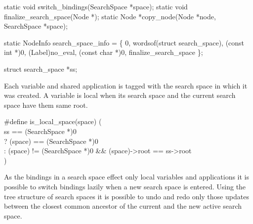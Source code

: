 static void switch_bindings(SearchSpace *space);
static void finalize_search_space(Node *);
static Node *copy_node(Node *node, SearchSpace *space);

static NodeInfo search_space_info = \{
    0, wordsof(struct search_space), (const int *)0, (Label)no_eval, (const char *)0,
    finalize_search_space
\};

struct search_space *ss;

\nwendcode{}\nwdocspar
Each variable and shared application is tagged with the search space
in which it was created. A variable is local when its search space and
the current search space have them same root.

\nwenddocs{}\plusendmoddef\nwstartdeflinemarkup{}\nwenddeflinemarkup
#define is_local_space(space) ( \\
    ss == (SearchSpace *)0 \\
    ? (space) == (SearchSpace *)0 \\
    : (space) != (SearchSpace *)0 && (space)->root == ss->root \\
)

\nwendcode{}\nwdocspar
As the bindings in a search space effect only local variables and
applications it is possible to switch bindings lazily when a new
search space is entered. Using the tree structure of search spaces it
is possible to undo and redo only those updates between the closest
common ancestor of the current and the new active search space.

